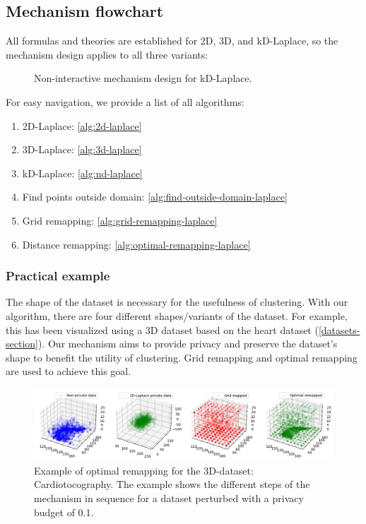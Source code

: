 \subsection{Mechanism flowchart}
All formulas and theories are established for 2D, 3D, and kD-Laplace, so the mechanism design applies to all three variants:
\begin{figure}[H]
    
    \caption{Non-interactive mechanism design for kD-Laplace.}
    \label{fig:final-mechanism-design}
\end{figure}
For easy navigation, we provide a list of all algorithms:
\begin{enumerate}
    \item 2D-Laplace:  \ref{alg:2d-laplace}
    \item 3D-Laplace: \ref{alg:3d-laplace}
    \item kD-Laplace: \ref{alg:nd-laplace}
    \item Find points outside domain: \ref{alg:find-outside-domain-laplace}
    \item Grid remapping: \ref{alg:grid-remapping-laplace}
    \item Distance remapping: \ref{alg:optimal-remapping-laplace}
\end{enumerate}
\subsubsection{Practical example}
The shape of the dataset is necessary for the usefulness of clustering.
With our algorithm, there are four different shapes/variants of the dataset.
For example, this has been visualized using a 3D dataset based on the heart dataset (\ref{datasets-section}).
Our mechanism aims to provide privacy and preserve the dataset's shape to benefit the utility of clustering.
Grid remapping and optimal remapping are used to achieve this goal.

\begin{figure}[H]
    \includegraphics[width=1.1\textwidth]{TheorethicalFramework/ND-Laplace/Images/optimal-remapping-example.png}
    \caption{Example of optimal remapping for the 3D-dataset: Cardiotocography. The example shows the different steps of the mechanism in sequence for a dataset perturbed with a privacy budget of 0.1.}
\end{figure}

